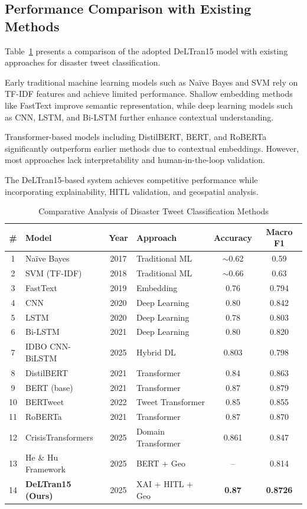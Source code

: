 \documentclass[pdflatex,sn-mathphys-num]{sn-jnl}%
\theoremstyle{thmstyleone}%
\theoremstyle{thmstyletwo}%
\theoremstyle{thmstylethree}%
\begin{document}
\subsection{Performance Comparison with Existing Methods}

Table~\ref{tab:comparison} presents a comparison of the adopted DeLTran15 model with existing approaches for disaster tweet classification.

Early traditional machine learning models such as Na\"{i}ve Bayes and SVM rely on TF-IDF features and achieve limited performance. Shallow embedding methods like FastText improve semantic representation, while deep learning models such as CNN, LSTM, and Bi-LSTM further enhance contextual understanding.

Transformer-based models including DistilBERT, BERT, and RoBERTa significantly outperform earlier methods due to contextual embeddings. However, most approaches lack interpretability and human-in-the-loop validation.

The DeLTran15-based system achieves competitive performance while incorporating explainability, HITL validation, and geospatial analysis.

\begin{table}[t]
\centering
\caption{Comparative Analysis of Disaster Tweet Classification Methods}
\label{tab:comparison}
\begin{tabular}{|c|l|c|l|c|c|}
\hline
\textbf{\#} & \textbf{Model} & \textbf{Year} & \textbf{Approach} & \textbf{Accuracy} & \textbf{Macro F1} \\
\hline
1 & Na\"{i}ve Bayes & 2017 & Traditional ML & $\sim$0.62 & 0.59 \\
2 & SVM (TF-IDF) & 2018 & Traditional ML & $\sim$0.66 & 0.63 \\
3 & FastText & 2019 & Embedding & 0.76 & 0.794 \\
4 & CNN & 2020 & Deep Learning & 0.80 & 0.842 \\
5 & LSTM & 2020 & Deep Learning & 0.78 & 0.803 \\
6 & Bi-LSTM & 2021 & Deep Learning & 0.80 & 0.820 \\
7 & IDBO CNN-BiLSTM & 2025 & Hybrid DL & 0.803 & 0.798 \\
8 & DistilBERT & 2021 & Transformer & 0.84 & 0.863 \\
9 & BERT (base) & 2021 & Transformer & 0.87 & 0.879 \\
10 & BERTweet & 2022 & Tweet Transformer & 0.85 & 0.855 \\
11 & RoBERTa & 2021 & Transformer & 0.87 & 0.870 \\
12 & CrisisTransformers & 2025 & Domain Transformer & 0.861 & 0.847 \\
13 & He \& Hu Framework & 2025 & BERT + Geo & -- & 0.814 \\
14 & \textbf{DeLTran15 (Ours)} & 2025 & XAI + HITL + Geo & \textbf{0.87} & \textbf{0.8726} \\
\hline
\end{tabular}
\end{table}
\end{document}
